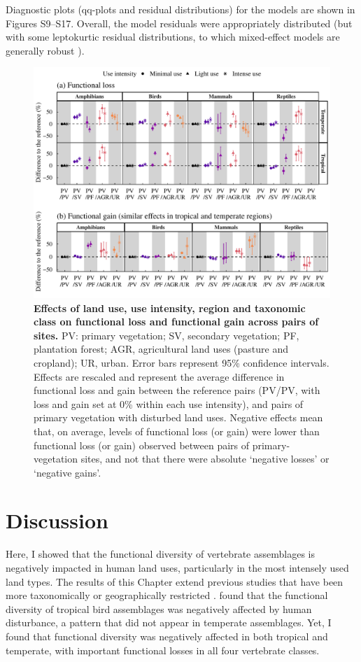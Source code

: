 Diagnostic plots (qq-plots and residual distributions) for the models are shown in Figures S9–S17. Overall, the model residuals were appropriately distributed (but with some leptokurtic residual distributions, to which mixed-effect models are generally robust \citep{Schielzeth2020}).

\begin{figure}[h!]
\centering
\includegraphics[scale=0.75]{figures/Chapter_FD/Figure6}
\caption[Effects of land use, use intensity, region and taxonomic class on functional loss and functional gain across pairs of sites.]{\textbf{Effects of land use, use intensity, region and taxonomic class on functional loss and functional gain across pairs of sites.}  PV: primary vegetation; SV, secondary vegetation; PF, plantation forest; AGR, agricultural land uses (pasture and cropland); UR, urban. Error bars represent 95\% confidence intervals. Effects are rescaled and represent the average difference in functional loss and gain between the reference pairs (PV/PV, with loss and gain set at 0\% within each use intensity), and pairs of primary vegetation with disturbed land uses. Negative effects mean that, on average, levels of functional loss (or gain) were lower than functional loss (or gain) observed between pairs of primary-vegetation sites, and not that there were absolute `negative losses' or `negative gains'.}
\label{chap3_fig6}
\end{figure}

\section{Discussion}
Here, I showed that the functional diversity of vertebrate assemblages is negatively impacted in human land uses, particularly in the most intensely used land types. The results of this Chapter extend previous studies that have been more taxonomically or geographically restricted \citep{Flynn2009, Matuoka2020}. \citet{Matuoka2020} found that the functional diversity of tropical bird assemblages was negatively affected by human disturbance, a pattern that did not appear in temperate assemblages. Yet, I found that functional diversity was negatively affected in both tropical and temperate, with important functional losses in all four vertebrate classes.

